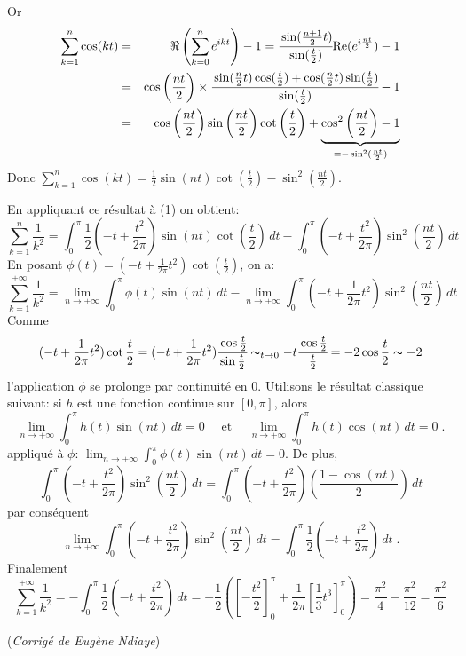 {{\[\]
Or 
\begin{eqnarray*}
\sum_{k = 1}^{n} \cos(kt) &=& 
\Re \left(\sum_{k = 0}^{n}e^{ikt}\right) - 1 = \cfrac{ \sin(\frac{n+1}{2}t)} { \sin(\frac{t}{2}) }\text{Re}(e^{i \frac{nt}{2} })  - 1 
\\
&=& \cos \left( \frac{nt}{2} \right) \times \cfrac{ \sin( \frac{n}{2}t )\cos( \frac{t}{2} ) + \cos( \frac{n}{2}t )\sin( \frac{t}{2} ) } { \sin(\frac{t}{2}) } - 1 
\\
&=& \cos \left( \frac{nt}{2} \right) \sin \left( \frac{nt}{2} \right) \cot \left( \frac{t}{2} \right) + \underbrace{ \cos^2 \left( \frac{nt}{2} \right) - 1 }_{ = -\sin^2(\frac{nt}{2}) }  
\end{eqnarray*}
Donc $\sum_{k = 1}^{n} \cos(kt) 
= \frac{1}{2}\sin(nt)\cot \left( \frac{t}{2} \right) - \sin^2 \left( \frac{nt}{2} \right)$.

En appliquant ce résultat à (1) on obtient:
\[  
\sum_{k = 1}^{n} \frac{1}{k^2} 
=  \int_{0}^{\pi} \frac{1}{2} \left(-t + \frac{t^2}{2\pi} \right) \sin(nt)\cot \left( \frac{t}{2} \right) \, dt 
- \int_{0}^{\pi} \left(-t + \frac{t^2}{2\pi} \right) \sin^2 \left(\frac{nt}{2} \right) \, dt  
\] 
En posant $ \phi (t) = (-t + \frac{1}{2\pi} t^2)\cot(\frac{t}{2}) $, on a:
\[ \sum_{k = 1}^{+\infty} \frac{1}{k^2} 
= \lim_{n \to +\infty} \int_{0}^{\pi} \phi (t)\sin(nt)\, dt 
- \lim_{n \to +\infty}\int_{0}^{\pi} \left(-t + \frac{1}{2\pi} t^2 \right) \sin^2 \left(\frac{nt}{2} \right) \, dt 
\]
Comme
\[ 
(-t + \frac{1}{2\pi} t^2)\cot \frac{t}{2}
= (-t + \frac{1}{2\pi} t^2) \cfrac{\cos \frac{t}{2}}{\sin \frac{t}{2}}  
\thicksim_{t \to 0} - t \cfrac{\cos \frac{t}{2}} {\frac{t}{2}} = - 2 \cos \frac{t}{2}
\thicksim - 2
\] 
l'application $\phi$ se prolonge par continuité en $0$.
Utilisons le résultat classique suivant: si $h$ est une fonction continue sur $[0, \pi]$, alors
\[ 
\lim_{n \to +\infty} \int_{0}^{\pi} h(t)\sin(nt)\, dt = 0 \quad \text{ et } \quad
\lim_{n \to +\infty} \int_{0}^{\pi} h(t)\cos(nt)\, dt = 0 \; .
\]
appliqué à $\phi$: $\lim_{n \to +\infty} \int_{0}^{\pi} \phi (t)\sin(nt)\, dt = 0$.
De plus, \[ \int_{0}^{\pi} \left(-t + \frac{t^2}{2\pi} \right) \sin^2 \left(\frac{nt}{2} \right) \, dt 
          = \int_{0}^{\pi} \left(-t + \frac{t^2}{2\pi} \right) \left(\frac{1 - \cos(nt)}{2} \right)\, dt 
\]
par conséquent 
\[
\lim_{n \to +\infty} \int_{0}^{\pi} \left(-t + \frac{t^2}{2\pi} \right) \sin^2 \left( \frac{nt}{2} \right) \, dt 
= \int_{0}^{\pi} \frac{1}{2} \left( -t + \frac{t^2}{2\pi} \right) \, dt \; .
\]
Finalement
\[ 
\sum_{k = 1}^{+\infty} \frac{1}{k^2} 
= - \int_{0}^{\pi} \frac{1}{2} \left(-t + \frac{t^2}{2\pi} \right) \, dt 
= -\frac{1}{2} \left( \left[ -\frac{t^2}{2} \right]_{0}^{\pi} + \frac{1}{2\pi} 
\left[ \frac{1}{3}t^3 \right]_{0}^{\pi} \right) 
= \frac{\pi^2}{4} - \frac{\pi^2}{12} = \frac{\pi^2}{6}
\]

\medskip

(\emph{Corrigé de Eugène Ndiaye})
}
}
